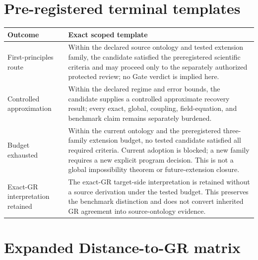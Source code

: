 \documentclass[11pt]{article}
\begin{document}
\section{Pre-registered terminal templates}

\begin{longtable}{p{}p{}}
\toprule
Outcome & Exact scoped template\\
\midrule
First-principles route & Within the declared source ontology and tested
extension family, the candidate satisfied the preregistered scientific
criteria and may proceed only to the separately authorized protected review;
no Gate verdict is implied here.\\
Controlled approximation & Within the declared regime and error bounds, the
candidate supplies a controlled approximate recovery result; every exact,
global, coupling, field-equation, and benchmark claim remains separately
burdened.\\
Budget exhausted & Within the current ontology and the preregistered three-family
extension budget, no tested candidate satisfied all required criteria. Current
adoption is blocked; a new family requires a new explicit program decision.
This is not a global impossibility theorem or future-extension closure.\\
Exact-GR interpretation retained & The exact-GR target-side interpretation is
retained without a source derivation under the tested budget. This preserves
the benchmark distinction and does not convert inherited GR agreement into
source-ontology evidence.\\
\bottomrule
\end{longtable}

\section{Expanded Distance-to-GR matrix}
\end{document}
